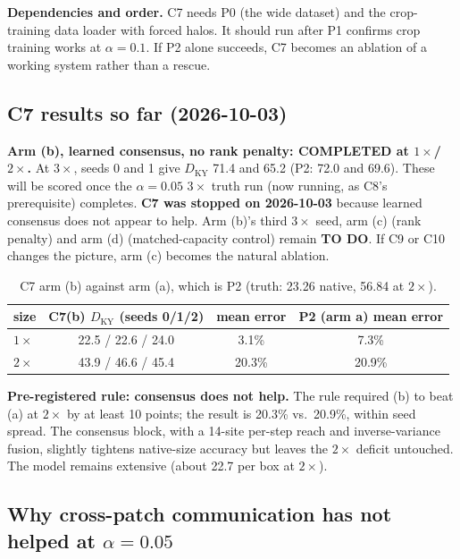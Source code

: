 \documentclass[11pt]{article}
\begin{document}
\textbf{Dependencies and order.} C7 needs P0 (the wide dataset) and the
crop-training data loader with forced halos. It should run after P1
confirms crop training works at $\alpha{=}0.1$. If P2 alone succeeds, C7
becomes an ablation of a working system rather than a rescue.

\subsection{C7 results so far (2026-10-03)}
\label{sec:c7_results}

\textbf{Arm (b), learned consensus, no rank penalty: COMPLETED at
$1\times$/$2\times$.} At $3\times$, seeds 0 and 1 give $D_{\mathrm{KY}}$
71.4 and 65.2 (P2: 72.0 and 69.6). These will be scored once the
$\alpha{=}0.05$ $3\times$ truth run (now running, as C8's prerequisite)
completes. \textbf{C7 was stopped on 2026-10-03} because learned
consensus does not appear to help. Arm (b)'s third $3\times$ seed, arm
(c) (rank penalty) and arm (d) (matched-capacity control) remain
\textbf{TO DO}. If C9 or C10 changes the picture, arm (c) becomes the
natural ablation.

\begin{table}[h]
\centering
\small
\begin{tabular}{lccc}
\toprule
size & C7(b) $D_{\mathrm{KY}}$ (seeds 0/1/2) & mean error & P2 (arm a) mean error \\
\midrule
$1\times$ & 22.5 / 22.6 / 24.0 & 3.1\% & 7.3\% \\
$2\times$ & 43.9 / 46.6 / 45.4 & 20.3\% & 20.9\% \\
\bottomrule
\end{tabular}
\caption{C7 arm (b) against arm (a), which is P2 (truth: 23.26 native,
56.84 at $2\times$).}
\label{tab:c7b}
\end{table}

\textbf{Pre-registered rule: consensus does not help.} The rule required
(b) to beat (a) at $2\times$ by at least 10 points; the result is
20.3\% vs.\ 20.9\%, within seed spread. The consensus block, with a
14-site per-step reach and inverse-variance fusion, slightly tightens
native-size accuracy but leaves the $2\times$ deficit untouched. The model
remains extensive (about 22.7 per box at $2\times$).

\subsection{Why cross-patch communication has not helped at $\alpha{=}0.05$}
\label{sec:c8_diag}
\end{document}

